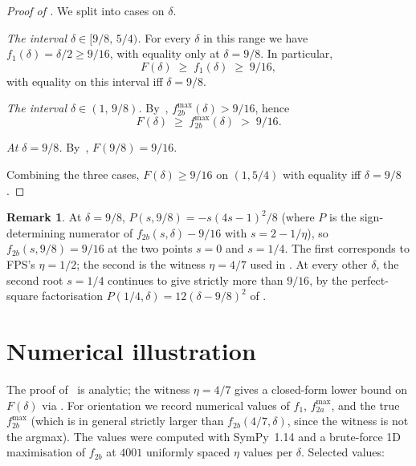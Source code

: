 \documentclass[11pt,a4paper]{article}
\theoremstyle{definition}
\newtheorem{remark}[theorem]{Remark}
\begin{document}
\begin{proof}[Proof of ]
We split into cases on $\delta$.

\textit{The interval $\delta \in [9/8,\,5/4)$.}
For every $\delta$ in this range we have $f_1(\delta) = \delta/2
\ge 9/16$, with equality only at $\delta = 9/8$. In particular,
\[
   F(\delta) \;\ge\; f_1(\delta) \;\ge\; 9/16,
\]
with equality on this interval iff $\delta = 9/8$.

\textit{The interval $\delta \in (1,\,9/8)$.}
By~, $f_{2b}^{\max}(\delta) > 9/16$, hence
\[
   F(\delta) \;\ge\; f_{2b}^{\max}(\delta) \;>\; 9/16.
\]

\textit{At $\delta = 9/8$.}
By~\cite[Claim 3.7]{FPS}, $F(9/8) = 9/16$.

Combining the three cases, $F(\delta) \ge 9/16$ on $(1, 5/4)$
with equality iff $\delta = 9/8$.
\end{proof}

\begin{remark}\label{rem:two-roots-at-9-over-8}
At $\delta = 9/8$, $P(s, 9/8) = -s(4s - 1)^2/8$ (where $P$ is the
sign-determining numerator of $f_{2b}(s, \delta) - 9/16$ with
$s = 2 - 1/\eta$), so $f_{2b}(s, 9/8) = 9/16$ at the two points
$s = 0$ and $s = 1/4$. The first corresponds to FPS's
$\eta = 1/2$; the second is the witness $\eta = 4/7$ used in
. At every other $\delta$, the second
root $s = 1/4$ continues to give strictly more than $9/16$, by
the perfect-square factorisation
$P(1/4, \delta) = 12(\delta - 9/8)^2$ of .
\end{remark}

\section{Numerical illustration}\label{sec:numerics}

The proof of~ is analytic; the witness
$\eta = 4/7$ gives a closed-form lower bound on $F(\delta)$ via
. For orientation we record numerical values
of $f_1$, $f_{2a}^{\max}$, and the true $f_{2b}^{\max}$ (which is
in general strictly larger than $f_{2b}(4/7, \delta)$, since the
witness is not the argmax). The values were computed with
SymPy~1.14 and a brute-force 1D maximisation of $f_{2b}$ at
$4001$ uniformly spaced $\eta$ values per $\delta$. Selected
values:
\end{document}
